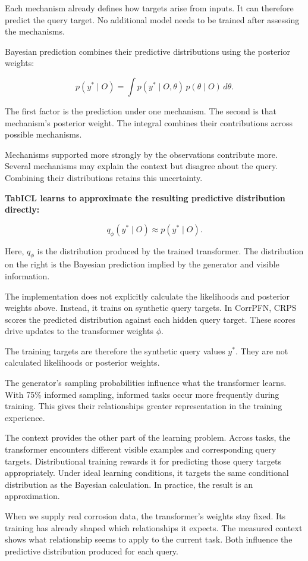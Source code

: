 \documentclass[11pt]{article}
\begin{document}
Each mechanism already defines how targets arise from inputs. It can therefore predict the
query target. No additional model needs to be trained after assessing the mechanisms.

Bayesian prediction combines their predictive distributions using the posterior weights:

\[
p(y^\ast\mid O)
=
\int
p(y^\ast\mid O,\theta)\,
p(\theta\mid O)\,d\theta.
\]

The first factor is the prediction under one mechanism. The second is that mechanism’s
posterior weight. The integral combines their contributions across possible mechanisms.

Mechanisms supported more strongly by the observations contribute more. Several mechanisms
may explain the context but disagree about the query. Combining their distributions
retains this uncertainty.

\textbf{TabICL learns to approximate the resulting predictive distribution directly:}

\[
q_\phi(y^\ast\mid O)
\approx
p(y^\ast\mid O).
\]

Here, \(q_\phi\) is the distribution produced by the trained transformer. The distribution
on the right is the Bayesian prediction implied by the generator and visible information.

The implementation does not explicitly calculate the likelihoods and posterior weights
above. Instead, it trains on synthetic query targets. In CorrPFN, CRPS scores the
predicted distribution against each hidden query target. These scores drive updates to the
transformer weights \(\phi\).

The training targets are therefore the synthetic query values \(y^\ast\). They are not
calculated likelihoods or posterior weights.

The generator’s sampling probabilities influence what the transformer learns. With 75\%
informed sampling, informed tasks occur more frequently during training. This gives their
relationships greater representation in the training experience.

The context provides the other part of the learning problem. Across tasks, the transformer
encounters different visible examples and corresponding query targets. Distributional
training rewards it for predicting those query targets appropriately. Under ideal learning
conditions, it targets the same conditional distribution as the Bayesian calculation. In
practice, the result is an approximation.

When we supply real corrosion data, the transformer’s weights stay fixed. Its training has
already shaped which relationships it expects. The measured context shows what
relationship seems to apply to the current task. Both influence the predictive
distribution produced for each query.
\end{document}

